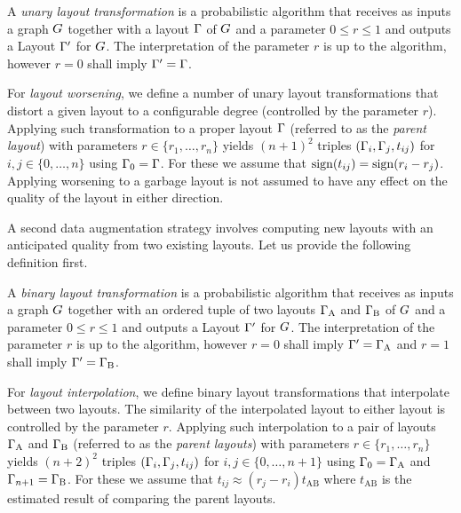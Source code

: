\documentclass{graphstudy}
\begin{document}
\begin{definition}
  A \emph{unary layout transformation} is a probabilistic algorithm that receives as inputs a graph \(G\) together
  with a layout \(\Gamma\) of \(G\) and a parameter \(0\leq{}r\leq{}1\) and outputs a Layout \(\Gamma'\) for
  \(G\).  The interpretation of the parameter \(r\) is up to the algorithm, however \(r=0\) shall imply
  \(\Gamma'=\Gamma\).
  \label{def:unitrans}
\end{definition}

For \emph{layout worsening}, we define a number of unary layout transformations that distort a given layout to a
configurable degree (controlled by the parameter \(r\)).  Applying such transformation to a proper layout \(\Gamma\)
(referred to as the \emph{parent layout}) with parameters \(r\in\{r_1,\ldots,r_n\}\) yields \((n+1)^2\) triples
\((\Gamma_i,\Gamma_j,t_{ij})\) for \(i,j\in\{0,\ldots,n\}\) using \(\Gamma_0=\Gamma\).  For these we assume that
\(\operatorname{sign}(t_{ij})=\operatorname{sign}(r_i - r_j)\).  Applying worsening to a garbage layout is not assumed to have any effect on the
quality of the layout in either direction.

A second data augmentation strategy involves computing new layouts with an anticipated quality from two existing
layouts.  Let us provide the following definition first.

\begin{definition}
  A \emph{binary layout transformation} is a probabilistic algorithm that receives as inputs a graph \(G\) together
  with an ordered tuple of two layouts \(\Gamma_\mathrm{A}\) and \(\Gamma_\mathrm{B}\) of \(G\) and a parameter
  \(0\leq{}r\leq{}1\) and outputs a Layout \(\Gamma'\) for \(G\).  The interpretation of the parameter \(r\) is up
  to the algorithm, however \(r=0\) shall imply \(\Gamma'=\Gamma_\mathrm{A}\) and \(r=1\) shall imply
  \(\Gamma'=\Gamma_\mathrm{B}\).
  \label{def:bitrans}
\end{definition}

For \emph{layout interpolation}, we define binary layout transformations that interpolate between two layouts.  The
similarity of the interpolated layout to either layout is controlled by the parameter \(r\).  Applying such
interpolation to a pair of layouts \(\Gamma_\mathrm{A}\) and \(\Gamma_\mathrm{B}\) (referred to as the \emph{parent
  layouts}) with parameters \(r\in\{r_1,\ldots,r_n\}\) yields \((n+2)^2\) triples \((\Gamma_i,\Gamma_j,t_{ij})\) for
\(i,j\in\{0,\ldots,n+1\}\) using \(\Gamma_0=\Gamma_\mathrm{A}\) and \(\Gamma_{n+1}=\Gamma_\mathrm{B}\).  For these
we assume that \(t_{ij}\approx(r_j - r_i)t_\mathrm{AB}\) where \(t_\mathrm{AB}\) is the estimated result of comparing
the parent layouts.
\end{document}
